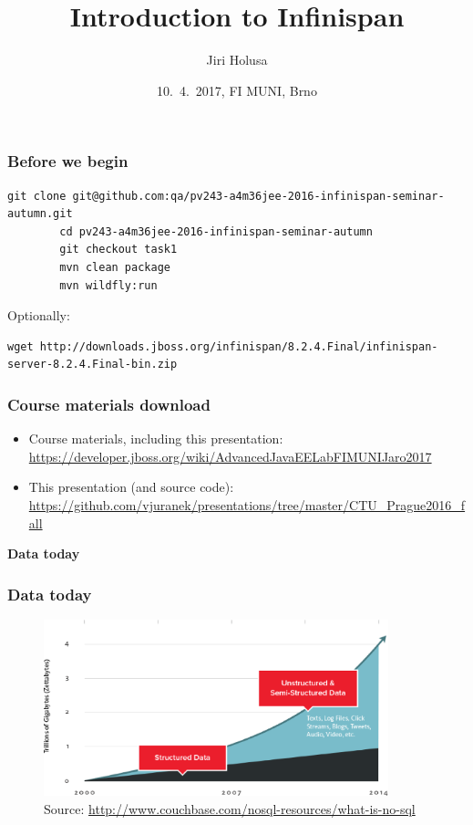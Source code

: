 \documentclass[10pt,utf8]{beamer}
\title{Introduction to Infinispan}
\author{Jiri Holusa}
\institute[Red Hat]{JBoss - a division by Red Hat}
\date{10.~4.~2017, FI MUNI, Brno}
\begin{document}


\begin{frame}[fragile]
	\frametitle{Before we begin}
	\begin{lstlisting}[style=Bash]
		git clone git@github.com:qa/pv243-a4m36jee-2016-infinispan-seminar-autumn.git
		cd pv243-a4m36jee-2016-infinispan-seminar-autumn
		git checkout task1
		mvn clean package
		mvn wildfly:run
	\end{lstlisting}
	\vspace{0.5cm}
	Optionally:
	\begin{lstlisting}[style=Bash]
		wget http://downloads.jboss.org/infinispan/8.2.4.Final/infinispan-server-8.2.4.Final-bin.zip
	\end{lstlisting}
\end{frame}

\begin{frame}
 \titlepage
\end{frame}

\begin{frame}
	\frametitle{Course materials download}
	\scriptsize{
	\begin{itemize}
		\item Course materials, including this presentation:\\
		\color{blue}\url{https://developer.jboss.org/wiki/AdvancedJavaEELabFIMUNIJaro2017}\color{black}
		\item This presentation (and source code):\\ 
		\color{blue}\url{https://github.com/vjuranek/presentations/tree/master/CTU_Prague2016_fall}\color{black}
	\end{itemize}
	}
\end{frame}

\begin{frame}
	\centering
	\huge{\textbf{Data today}}
\end{frame}


\begin{frame}
	\frametitle{Data today}
	\begin{figure}
		\centering
		\includegraphics[width=10cm]{./img/why-nosql-2.eps}
		\caption{\tiny{Source: \url{http://www.couchbase.com/nosql-resources/what-is-no-sql}}}
	\end{figure}
\end{frame}
\end{document}
